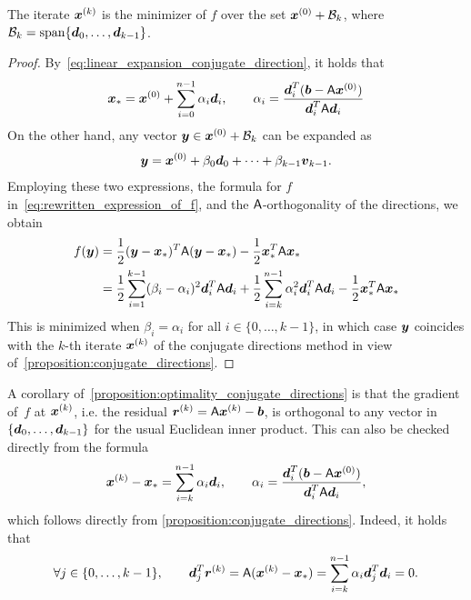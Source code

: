 \begin{proposition}
    \label{proposition:optimality_conjugate_directions}
    The iterate $\mathbf{\boldsymbol{x}}^{(k)}$ is the minimizer of $f$ over the set $\mathbf{\boldsymbol{x}}^{(0)} + \mathcal B_k$,
    where $\mathcal B_k = \operatorname{span} \{\mathbf{\boldsymbol{d}}_0, \dotsc, \mathbf{\boldsymbol{d}}_{k-1} \}$.
\end{proposition}
\begin{proof}
    By~\eqref{eq:linear_expansion_conjugate_direction},
    it holds that
    \begin{equation*}
        \mathbf{\boldsymbol{x}}_* = \mathbf{\boldsymbol{x}}^{(0)} + \sum_{i=0}^{n-1} \alpha_i \mathbf{\boldsymbol{d}}_i,
        \qquad
        \alpha_i = \frac{\mathbf{\boldsymbol{d}}_i^T (\mathbf{\boldsymbol{b}} - \mathsf A \mathbf{\boldsymbol{x}}^{(0)})}{\mathbf{\boldsymbol{d}}_i^T \mathsf A \mathbf{\boldsymbol{d}}_i}
    \end{equation*}
    On the other hand,
    any vector $\mathbf{\boldsymbol{y}} \in \mathbf{\boldsymbol{x}}^{(0)} + \mathcal B_k$ can be expanded as
    \[
        \mathbf{\boldsymbol{y}} = \mathbf{\boldsymbol{x}}^{(0)} + \beta_0 \mathbf{\boldsymbol{d}}_0 + \dotsb + \beta_{k-1} \mathbf{\boldsymbol{v}}_{k-1}.
    \]
    Employing these two expressions, the formula for $f$ in~\eqref{eq:rewritten_expression_of_f},
    and the $\mathsf A$-orthogonality of the directions,
    we obtain
    \begin{align*}
        f(\mathbf{\boldsymbol{y}})
        &= \frac{1}{2} (\mathbf{\boldsymbol{y}} - \mathbf{\boldsymbol{x}}_*)^T \mathsf A (\mathbf{\boldsymbol{y}} - \mathbf{\boldsymbol{x}}_*) - \frac{1}{2} \mathbf{\boldsymbol{x}}_*^T \mathsf A \mathbf{\boldsymbol{x}}_* \\
        &= \frac{1}{2} \sum_{i=1}^{k-1} (\beta_i - \alpha_i)^2 \mathbf{\boldsymbol{d}}_i^T \mathsf A \mathbf{\boldsymbol{d}}_i
        + \frac{1}{2} \sum_{i=k}^{n-1} \alpha_i^2 \mathbf{\boldsymbol{d}}_i^T \mathsf A \mathbf{\boldsymbol{d}}_i - \frac{1}{2} \mathbf{\boldsymbol{x}}_*^T \mathsf A \mathbf{\boldsymbol{x}}_*
    \end{align*}
    This is minimized when $\beta_i = \alpha_i$ for all $i \in \{0, \dotsc, k-1\}$,
    in which case $\mathbf{\boldsymbol{y}}$ coincides with the $k$-th iterate $\mathbf{\boldsymbol{x}}^{(k)}$ of the conjugate directions method in view of~\cref{proposition:conjugate_directions}.
\end{proof}
A corollary of~\eqref{proposition:optimality_conjugate_directions} is that the gradient of~$f$ at $\mathbf{\boldsymbol{x}}^{(k)}$,
i.e. the residual $\mathbf{\boldsymbol{r}}^{(k)} = \mathsf A \mathbf{\boldsymbol{x}}^{(k)} - \mathbf{\boldsymbol{b}}$,
is orthogonal to any vector in $\{\mathbf{\boldsymbol{d}}_0, \dotsc, \mathbf{\boldsymbol{d}}_{k-1} \}$ for the usual Euclidean inner product.
This can also be checked directly from the formula
\[
    \mathbf{\boldsymbol{x}}^{(k)} - \mathbf{\boldsymbol{x}}_* = \sum_{i=k}^{n-1} \alpha_i \mathbf{\boldsymbol{d}}_i,
    \qquad \alpha_i = \frac{\mathbf{\boldsymbol{d}}_i^T (\mathbf{\boldsymbol{b}} - \mathsf A \mathbf{\boldsymbol{x}}^{(0)})}{\mathbf{\boldsymbol{d}}_i^T \mathsf A \mathbf{\boldsymbol{d}}_i},
\]
which follows directly from \cref{proposition:conjugate_directions}.
Indeed, it holds that
\begin{equation}
    \label{eq:orthogonality_residual}
    \forall j \in \{0, \dotsc, k-1\}, \qquad
    \mathbf{\boldsymbol{d}}_j^T \mathbf{\boldsymbol{r}}^{(k)} = \mathsf A (\mathbf{\boldsymbol{x}}^{(k)} - \mathbf{\boldsymbol{x}}_*)
    = \sum_{i=k}^{n-1} \alpha_i \mathbf{\boldsymbol{d}}_j^T \mathbf{\boldsymbol{d}}_i = 0.
\end{equation}

